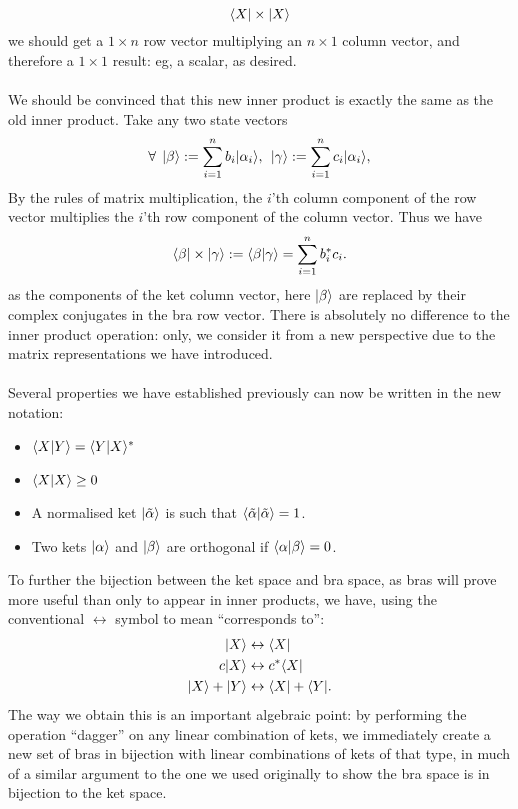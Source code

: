 $$
\langle X| \times |X\rangle
$$
we should get a $1\times n$ row vector multiplying an $n\times 1$ column vector, and therefore a $1\times 1$ result: eg, a scalar, as desired. 
\\\\
We should be convinced that this new inner product is exactly the same as the old inner product. Take any two state vectors
$$
\forall\:\:|\beta\rangle:=\sum_{i=1}^{n}b_{i}|\alpha_{i}\rangle, \:\: |\gamma\rangle:=\sum_{i=1}^{n}c_{i}|\alpha_{i}\rangle,
$$
By the rules of matrix multiplication, the  $i$'th column component of the row vector multiplies the $i$'th row component of the column vector. Thus we have
$$
\langle\beta|\times|\gamma\rangle:=\langle\beta|\gamma\rangle=\sum_{i=1}^{n}b^{\ast}_{i}c_{i}.
$$
as the components of the ket column vector, here $|\beta\rangle$ are replaced by their complex conjugates in the bra row vector. There is absolutely no difference to the inner product operation: only, we consider it from a new perspective due to the matrix representations we have introduced.
\\\\
Several properties we have established previously can now be written in the new notation:
\begin{itemize}
    \item $\langle X|Y\rangle=\langle Y|X\rangle^{\ast}$
    \item $\langle X|X\rangle\geq0$
    \item A normalised ket $|\tilde{\alpha}\rangle$ is such that $\langle\tilde{\alpha}|{\tilde{\alpha}}\rangle=1$.
    \item Two kets $|\alpha\rangle$ and $|\beta\rangle$ are orthogonal if $\langle\alpha|\beta\rangle=0$.
\end{itemize}
To further the bijection between the ket space and bra space, as bras will prove more useful than only to appear in inner products, we have, using the conventional $\leftrightarrow$ symbol to mean ``corresponds to'':
$$
\begin{aligned}
|X\rangle&\leftrightarrow\langle X|\\
c|X\rangle&\leftrightarrow c^{\ast}\langle X|\\
|X\rangle+|Y\rangle&\leftrightarrow \langle X|+\langle Y|.\\
\end{aligned}
$$
The way we obtain this is an important algebraic point: by performing the operation ``dagger'' on any linear combination of kets, we immediately create a new set of bras in bijection with linear combinations of kets of that type, in much of a similar argument to the one we used originally to show the bra space is in bijection to the ket space.
